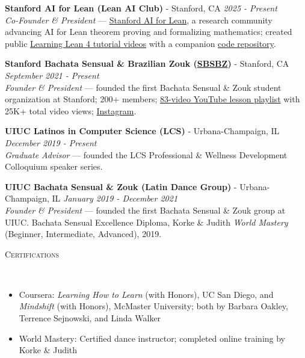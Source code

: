\documentclass{article}
\newenvironment{changemargin}[2]{%
  \begin{list}{}{%
    \setlength{\topsep}{0pt}%
    \setlength{\leftmargin}{#1}%
    \setlength{\rightmargin}{#2}%
    \setlength{\listparindent}{\parindent}%
    \setlength{\itemindent}{\parindent}%
    \setlength{\parsep}{\parskip}%
  }%
  \item[]}{\end{list}
}
\newcommand{\lineover}{
	\begin{changemargin}{-0.05in}{-0.05in}
		\vspace*{-8pt}
		\hrulefill \\
		\vspace*{-2pt}
	\end{changemargin}
}
\newcommand{\header}[1]{
	\begin{changemargin}{-0.5in}{-0.5in}
		\scshape{#1}\\
  	\lineover
	\end{changemargin}
	\nopagebreak[4]    %
}
\newenvironment{body} {
		\vspace*{-16pt}
		\begin{changemargin}{-0.25in}{-0.5in}
	  }
		{\end{changemargin}\vspace{8pt plus 12pt}
	}
\begin{document}
\begin{body}
	\vspace{12pt}

	\textbf{Stanford AI for Lean (Lean AI Club)} - Stanford, CA \hfill \emph{2025 - Present}\\
	\emph{Co-Founder \& President} --- \href{https://www.stanfordlean.club/}{Stanford AI for Lean}, a research community advancing AI for Lean theorem proving and formalizing mathematics; created public \href{https://www.youtube.com/playlist?list=PLB3sDpSRdrOt68MTR6kdI0Jc85Uuw1YWV}{Learning Lean 4 tutorial videos} with a companion \href{https://github.com/brando90/learning_lean/tree/main}{code repository}.\\
	\vspace{4pt}

	\textbf{Stanford Bachata Sensual \& Brazilian Zouk (\href{https://sbsbz-dance.manus.space/}{SBSBZ})} - Stanford, CA \hfill \emph{September 2021 - Present}\\
	\emph{Founder \& President} --- founded the first Bachata Sensual \& Zouk student organization at Stanford; 200+ members; \href{https://www.youtube.com/playlist?list=PLB3sDpSRdrOt6iKyPucMJAwbwW2YtMs3V}{83-video YouTube lesson playlist} with 25K+ total video views; \href{https://www.instagram.com/stanford_bachata_sensual_zouk/}{Instagram}.\\
	\vspace{4pt}

	\textbf{UIUC Latinos in Computer Science (LCS)} - Urbana-Champaign, IL \hfill \emph{December 2019 - Present}\\
	\emph{Graduate Advisor} --- founded the LCS Professional \& Wellness Development Colloquium speaker series.\\
	\vspace{4pt}

	\textbf{UIUC Bachata Sensual \& Zouk (Latin Dance Group)} - Urbana-Champaign, IL \hfill \emph{January 2019 - December 2021}\\
	\emph{Founder \& President} --- founded the first Bachata Sensual \& Zouk group at UIUC. Bachata Sensual Excellence Diploma, Korke \& Judith \textit{World Mastery} (Beginner, Intermediate, Advanced), 2019.\\
\end{body}

\header{Certifications}

\begin{body}
	\vspace{12pt}
	\begin{itemize} \itemsep -2pt
		\item Coursera: \textit{Learning How to Learn} (with Honors), UC San Diego, and \textit{Mindshift} (with Honors), McMaster University; both by Barbara Oakley, Terrence Sejnowski, and Linda Walker
		\item World Mastery: Certified dance instructor; completed online training by Korke \& Judith
	\end{itemize}
\end{body}
\end{document}
